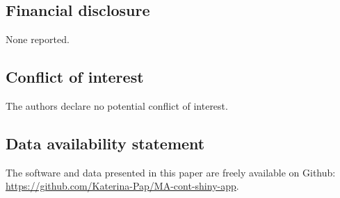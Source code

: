 \documentclass[AMA,STIX1COL]{WileyNJD-v2}
\begin{document}
%

\clearpage

\subsection*{Financial disclosure}

None reported.

\subsection*{Conflict of interest}

The authors declare no potential conflict of interest.

\subsection*{Data availability statement}
The software and data presented in this paper are freely available on Github: \url{https://github.com/Katerina-Pap/MA-cont-shiny-app}.


\end{document}

